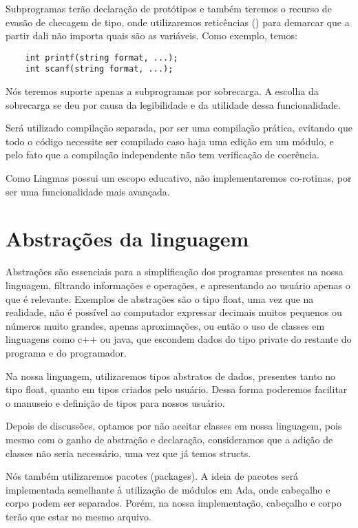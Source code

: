 Subprogramas terão declaração de protótipos e também teremos o recurso de
evasão de checagem de tipo, onde utilizaremos reticências () para
demarcar que a partir dali não importa quais são as variáveis. Como exemplo,
temos:

\begin{lstlisting}
    int printf(string format, ...);
    int scanf(string format, ...);
\end{lstlisting}

Nós teremos suporte apenas a subprogramas por sobrecarga. A escolha da
sobrecarga se deu por causa da legibilidade e da utilidade dessa
funcionalidade.

Será utilizado compilação separada, por ser uma compilação prática, evitando
que todo o código necessite ser compilado caso haja uma edição em um módulo, e
pelo fato que a compilação independente não tem verificação de coerência.

Como Lingmas possui um escopo educativo, não implementaremos co-rotinas, por
ser uma funcionalidade mais avançada.

\section{Abstrações da linguagem}
Abstrações são essenciais para a simplificação dos programas presentes na nossa
linguagem, filtrando informações e operações, e apresentando ao usuário apenas
o que é relevante. Exemplos de abstrações são o tipo float, uma vez que na
realidade, não é possível ao computador expressar  decimais muitos pequenos ou
números muito grandes, apenas aproximações, ou então o uso de classes em
linguagens como c++ ou java, que escondem dados do tipo private do restante do
programa e do programador.

Na nossa linguagem, utilizaremos tipos abstratos de dados, presentes tanto no
tipo float, quanto em tipos criados pelo usuário.  Dessa forma poderemos
facilitar o manuseio e definição de tipos para nossos usuário.

Depois de discussões, optamos por não aceitar classes em nossa linguagem, pois
mesmo com o ganho de abstração e declaração, consideramos que a adição de
classes não seria necessário, uma vez que já temos structs.

Nós também utilizaremos pacotes (packages). A ideia de pacotes será
implementada semelhante à utilização de módulos em Ada, onde cabeçalho e corpo
podem ser separados. Porém, na nossa implementação, cabeçalho e corpo terão que
estar no mesmo arquivo.


